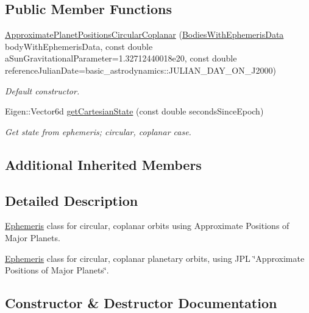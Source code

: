 \subsection*{Public Member Functions}
\begin{DoxyCompactItemize}
\item 
\hyperlink{classtudat_1_1ephemerides_1_1ApproximatePlanetPositionsCircularCoplanar_ae533f4f77671301038b2f9fe2cb489fe}{Approximate\+Planet\+Positions\+Circular\+Coplanar} (\hyperlink{classtudat_1_1ephemerides_1_1ApproximatePlanetPositionsBase_aa698885dcabac2815a6205d5502724d2}{Bodies\+With\+Ephemeris\+Data} body\+With\+Ephemeris\+Data, const double a\+Sun\+Gravitational\+Parameter=1.\+32712440018e20, const double reference\+Julian\+Date=basic\+\_\+astrodynamics\+::\+J\+U\+L\+I\+A\+N\+\_\+\+D\+A\+Y\+\_\+\+O\+N\+\_\+\+J2000)
\begin{DoxyCompactList}\small\item\em Default constructor. \end{DoxyCompactList}\item 
Eigen\+::\+Vector6d \hyperlink{classtudat_1_1ephemerides_1_1ApproximatePlanetPositionsCircularCoplanar_a72e87b71ccd875c6a349c1a9a0bcb544}{get\+Cartesian\+State} (const double seconds\+Since\+Epoch)
\begin{DoxyCompactList}\small\item\em Get state from ephemeris; circular, coplanar case. \end{DoxyCompactList}\end{DoxyCompactItemize}
\subsection*{Additional Inherited Members}


\subsection{Detailed Description}
\hyperlink{classtudat_1_1ephemerides_1_1Ephemeris}{Ephemeris} class for circular, coplanar orbits using Approximate Positions of Major Planets. 

\hyperlink{classtudat_1_1ephemerides_1_1Ephemeris}{Ephemeris} class for circular, coplanar planetary orbits, using J\+PL \char`\"{}\+Approximate Positions of Major Planets\char`\"{}. 

\subsection{Constructor \& Destructor Documentation}
